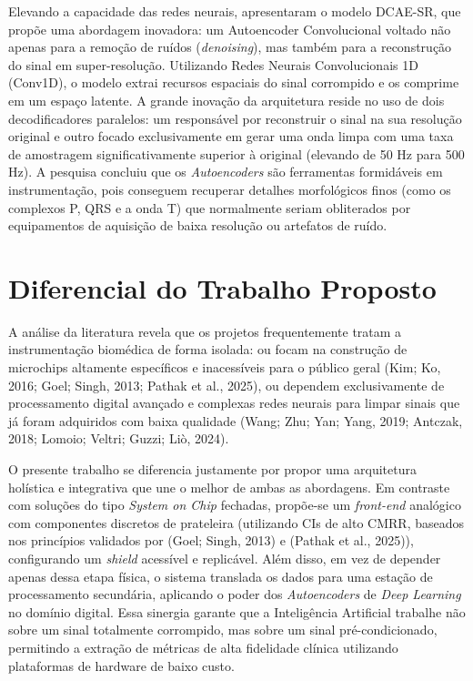 \documentclass[tcc,capa]{texufpel}
\begin{document}
Elevando a capacidade das redes neurais, \cite{lomoio2024} apresentaram o modelo DCAE-SR, que propõe uma abordagem inovadora: um Autoencoder Convolucional voltado não apenas para a remoção de ruídos (\textit{denoising}), mas também para a reconstrução do sinal em super-resolução. Utilizando Redes Neurais Convolucionais 1D (Conv1D), o modelo extrai recursos espaciais do sinal corrompido e os comprime em um espaço latente. A grande inovação da arquitetura reside no uso de dois decodificadores paralelos: um responsável por reconstruir o sinal na sua resolução original e outro focado exclusivamente em gerar uma onda limpa com uma taxa de amostragem significativamente superior à original (elevando de 50 Hz para 500 Hz). A pesquisa concluiu que os \textit{Autoencoders} são ferramentas formidáveis em instrumentação, pois conseguem recuperar detalhes morfológicos finos (como os complexos P, QRS e a onda T) que normalmente seriam obliterados por equipamentos de aquisição de baixa resolução ou artefatos de ruído.

\section{Diferencial do Trabalho Proposto}

A análise da literatura revela que os projetos frequentemente tratam a instrumentação biomédica de forma isolada: ou focam na construção de microchips altamente específicos e inacessíveis para o público geral (Kim; Ko, 2016; Goel; Singh, 2013; Pathak et al., 2025), ou dependem exclusivamente de processamento digital avançado e complexas redes neurais para limpar sinais que já foram adquiridos com baixa qualidade (Wang; Zhu; Yan; Yang, 2019; Antczak, 2018; Lomoio; Veltri; Guzzi; Liò, 2024).

O presente trabalho se diferencia justamente por propor uma arquitetura holística e integrativa que une o melhor de ambas as abordagens. Em contraste com soluções do tipo \textit{System on Chip} fechadas, propõe-se um \textit{front-end} analógico com componentes discretos de prateleira (utilizando CIs de alto CMRR, baseados nos princípios validados por (Goel; Singh, 2013) e (Pathak et al., 2025)), configurando um \textit{shield} acessível e replicável. Além disso, em vez de depender apenas dessa etapa física, o sistema translada os dados para uma estação de processamento secundária, aplicando o poder dos \textit{Autoencoders} de \textit{Deep Learning} no domínio digital. Essa sinergia garante que a Inteligência Artificial trabalhe não sobre um sinal totalmente corrompido, mas sobre um sinal pré-condicionado, permitindo a extração de métricas de alta fidelidade clínica utilizando plataformas de hardware de baixo custo.
\end{document}
